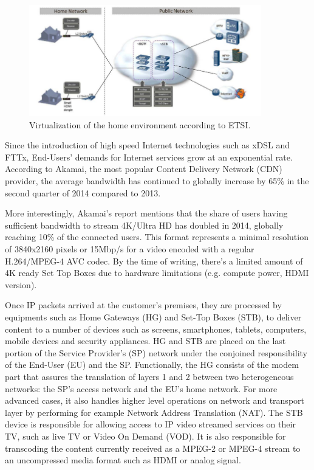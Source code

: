 \begin{figure}
  \begin{center}
    \includegraphics[width=0.90\textwidth,natwidth=769,natheight=369]{fig/vHGetsi.png}
  \end{center}
  \caption{ Virtualization of the home environment according to ETSI.
    \label{fig:etsi-vision}
  }
\end{figure}

Since the introduction of high speed Internet technologies such as xDSL and FTTx, End-Users' demands for Internet services grow at an exponential rate.
According to Akamai, the most popular Content Delivery Network (CDN) provider, the average bandwidth has continued to globally increase by 65\% in the second quarter of 2014 \cite{_akamais_2014} compared to 2013.

More interestingly, Akamai's report mentions that the share of users having sufficient bandwidth to stream 4K/Ultra HD has doubled in 2014, globally reaching 10\% of the connected users.
This format represents a minimal resolution of 3840x2160 pixels or 15Mbp/s for a video encoded with a regular H.264/MPEG-4 AVC codec.
By the time of writing, there's a limited amount of 4K ready Set Top Boxes due to hardware limitations (e.g. compute power, HDMI version).

Once IP packets arrived at the customer's premises, they are processed by equipments such as Home Gateways (HG) and Set-Top Boxes (STB), to deliver content to a number of devices such as screens, smartphones, tablets, computers, mobile devices and security appliances.
HG and STB are placed on the last portion of the Service Provider's (SP) network under the conjoined responsibility of the End-User (EU) and the SP.
Functionally, the HG consists of the modem part that assures the translation of layers 1 and 2 between two heterogeneous networks: the SP's access network and the EU's home network.
For more advanced cases, it also handles higher level operations on network and transport layer by performing for example Network Address Translation (NAT).
The STB device is responsible for allowing access to IP video streamed services on their TV, such as live TV or Video On Demand (VOD).
It is also responsible for transcoding the content currently received as a MPEG-2 or MPEG-4 stream to an uncompressed media format such as HDMI or analog signal.

